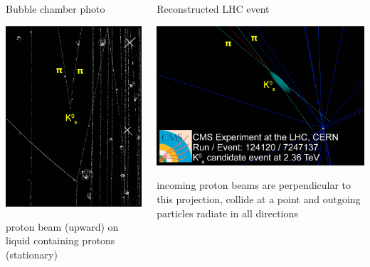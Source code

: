 \documentclass[compress]{beamer}
\begin{document}
\begin{frame}


\begin{columns}
\begin{center}
Bubble chamber photo

\vspace{0.1 cm}
\includegraphics[height=4.5 cm]{k0-to-pipi_bubblechamber.png}

\vspace{0.1 cm}
\scriptsize proton beam (upward) on liquid containing protons (stationary)
\end{center}

\begin{center}
Reconstructed LHC event

\vspace{0.1 cm}
\includegraphics[height=4.5 cm]{cms_kshort.png}

\vspace{0.1 cm}
\scriptsize incoming proton beams are perpendicular to this projection, collide at a point and outgoing particles radiate in all directions
\end{center}

\end{columns}

\end{frame}
\end{document}

